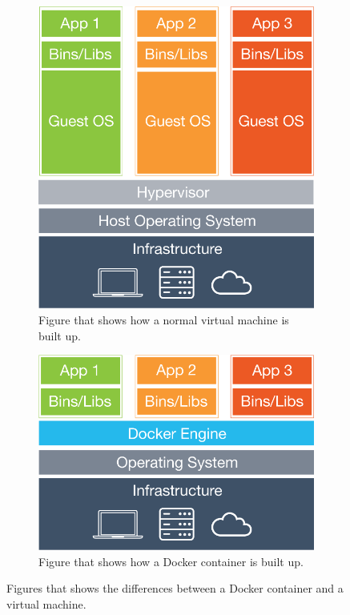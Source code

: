 \begin{figure}
\centering
\begin{subfigure}{.5\textwidth}
  \centering
  \includegraphics[width=\textwidth]{figs/docker-vm.png}
  \caption{Figure that shows how a normal virtual machine is built up.}
  \label{fig:vm-resources}
\end{subfigure}%

\begin{subfigure}{.5\textwidth}
  \centering
  \includegraphics[width=\textwidth]{figs/docker-docker.png}
  \caption{Figure that shows  how a Docker container is built up.}
  \label{fig:docker-resources}
\end{subfigure}
\caption{Figures that shows the differences between a Docker container and a virtual machine. \cite{docker-what-is}}
\label{fig:docker-vm-resources}
\end{figure}


